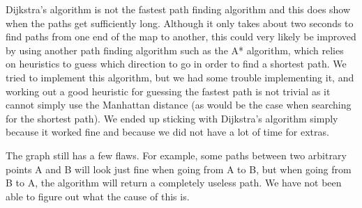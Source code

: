 Dijkstra's algorithm is not the fastest path finding algorithm and this does show when the paths get sufficiently long. Although it only takes about two seconds to find paths from one end of the map to another, this could very likely be improved by using another path finding algorithm such as the A* algorithm, which relies on heuristics to guess which direction to go in order to find a shortest path. We tried to implement this algorithm, but we had some trouble implementing it, and working out a good heuristic for guessing the fastest path is not trivial as it cannot simply use the Manhattan distance (as would be the case when searching for the shortest path). We ended up sticking with Dijkstra's algorithm simply because it worked fine and because we did not have a lot of time for extras.

The graph still has a few flaws. For example, some paths between two arbitrary points A and B will look just fine when going from A to B, but when going from B to A, the algorithm will return a completely useless path. We have not been able to figure out what the cause of this is.
